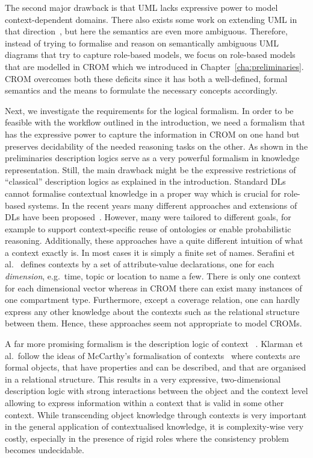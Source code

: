 The second major drawback is that UML lacks expressive power to model context-dependent
domains. There also exists some work on extending UML in that direction~\cite{ShB-ICMB05}, but here
the semantics are even more ambiguous.  Therefore, instead of trying to formalise and reason on
semantically ambiguous UML diagrams that try to capture role-based models, we focus on role-based
models that are modelled in CROM which we introduced in Chapter~\ref{cha:preliminaries}.  CROM
overcomes both these deficits since it has both a well-defined, formal semantics and the means to
formulate the necessary concepts accordingly.

Next, we investigate the requirements for the logical formalism. In order to be feasible with the
workflow outlined in the introduction, we need a formalism that has the expressive power
to capture the information in CROM on one hand but preserves decidability of the needed
reasoning tasks on the other.
%
As shown in the preliminaries description logics serve as a very powerful formalism in knowledge
representation. Still, the main drawback might be the expressive restrictions of \enquote{classical}
description logics as explained in the introduction. Standard DLs cannot formalise contextual
knowledge in a proper way which is crucial for role-based systems.  In the recent years many
different approaches and extensions of DLs have been proposed~\cite{BoGH-ISWC03, BoGH-WS04,
  BeAF-ADVIS06, BaVS-ModOnt09, BaKP-JWS12, CePe-IJCAR14, CePe-JAR17}.  However, many were tailored
to different goals, for example to support context-specific reuse of ontologies or enable
probabilistic reasoning. Additionally, these approaches have a quite different intuition of what a
context exactly is. In most cases it is simply a finite set of names.  Serafini et
al.~\cite{SeHo-JWS12} defines contexts by a set of attribute-value declarations, one for each
\emph{dimension}, e.g.\ time, topic or location to name a few. There is only one context for each
dimensional vector whereas in CROM there can exist many instances of one compartment type.  Furthermore,
except a coverage relation, one can hardly express any other knowledge about the contexts such as
the relational structure between them.  Hence, these approaches seem not appropriate to model
CROMs.

A far more promising formalism is the description logic of context \klarALC~\cite{KG-JELIA10, KG16}.
Klarman et al.\ follow the ideas of McCarthy's formalisation of
contexts~\cite{McC-ACM87,McC-IJCAI93} where contexts are formal objects, that have properties and
can be described, and that are organised in a relational structure.  This results in a very
expressive, two-dimensional description logic with strong interactions between the object and the
context level allowing to express information within a context that is valid in some other context.
While transcending object knowledge through contexts is very important in the general application of
contextualised knowledge, it is complexity-wise very costly, especially in the presence of rigid
roles where the consistency problem becomes undecidable.

